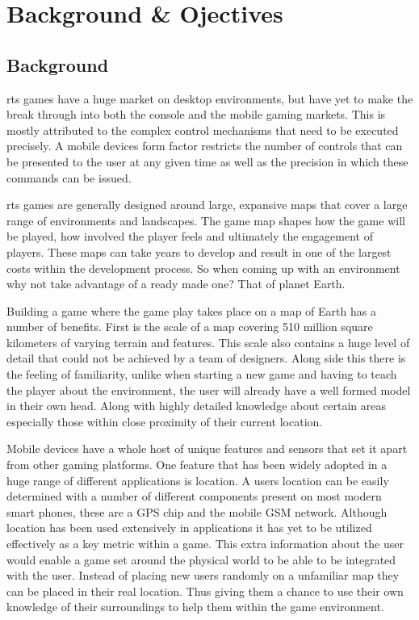 \chapter{Background \& Ojectives}

\section{Background}
\Gls{rts} games have a huge market on desktop environments, but have yet to make the break through into both the console and the mobile gaming markets. This is mostly attributed to the complex control mechanisms that need to be executed precisely. A mobile devices form factor restricts the number of controls that can be presented to the user at any given time as well as the precision in which these commands can be issued.

\Gls{rts} games are generally designed around large, expansive maps that cover a large range of environments and landscapes. The game map shapes how the game will be played, how involved the player feels and ultimately the engagement of players. These maps can take years to develop and result in one of the largest costs within the development process. So when coming up with an environment why not take advantage of a ready made one? That of planet Earth.

Building a game where the game play takes place on a map of Earth has a number of benefits. First is the scale of a map covering 510 million square kilometers of varying terrain and features. This scale also contains a huge level of detail that could not be achieved by a team of designers. Along side this there is the feeling of familiarity, unlike when starting a new game and having to teach the player about the environment, the user will already have a well formed model in their own head. Along with highly detailed knowledge about certain areas especially those within close proximity of their current location.

Mobile devices have a whole host of unique features and sensors that set it apart from other gaming platforms. One feature that has been widely adopted in a huge range of different applications is location. A users location can be easily determined with a number of different components present on most modern smart phones, these are a GPS chip and the mobile GSM network. Although location has been used extensively in applications it has yet to be utilized effectively as a key metric within a game. This extra information about the user would enable a game set around the physical world to be able to be integrated with the user. Instead of placing new users randomly on a unfamiliar map they can be placed in their real location. Thus giving them a chance to use their own knowledge of their surroundings to help them within the game environment.


